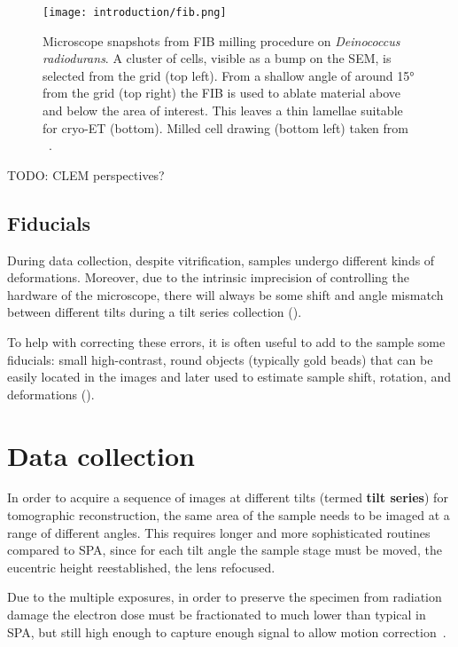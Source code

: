\begin{figure}[ht]
    \centering
    \texttt{[image: introduction/fib.png]}
    \caption[FIB milling]{Microscope snapshots from FIB milling procedure on \textit{Deinococcus radiodurans}. A cluster of cells, visible as a bump on the SEM, is selected from the grid (top left). From a shallow angle of around \ang{15} from the grid (top right) the FIB is used to ablate material above and below the area of interest. This leaves a thin lamellae suitable for cryo-ET (bottom). Milled cell drawing (bottom left) taken from ~\citet{villaOpeningWindowsCell2013}.}
    \label{fig:et_fib_milling}
\end{figure}

TODO: CLEM perspectives?

\subsection{Fiducials}\label{fiducials}
During data collection, despite vitrification, samples undergo different kinds of deformations.
Moreover, due to the intrinsic imprecision of controlling the hardware of the microscope, there will always be some shift and angle mismatch between different tilts during a tilt series collection ().

To help with correcting these errors, it is often useful to add to the sample some fiducials: small high-contrast, round objects (typically gold beads) that can be easily located in the images and later used to estimate sample shift, rotation, and deformations ().

\section{Data collection}\label{et_data_collection}
In order to acquire a sequence of images at different tilts (termed \textbf{tilt series}) for tomographic reconstruction, the same area of the sample needs to be imaged at a range of different angles.
This requires longer and more sophisticated routines compared to SPA, since for each tilt angle the sample stage must be moved, the eucentric height reestablished, the lens refocused.

Due to the multiple exposures, in order to preserve the specimen from radiation damage the electron dose must be fractionated to much lower than typical in SPA, but still high enough to capture enough signal to allow motion correction~\cite{mcewenRelevanceDosefractionationTomography1995}.

